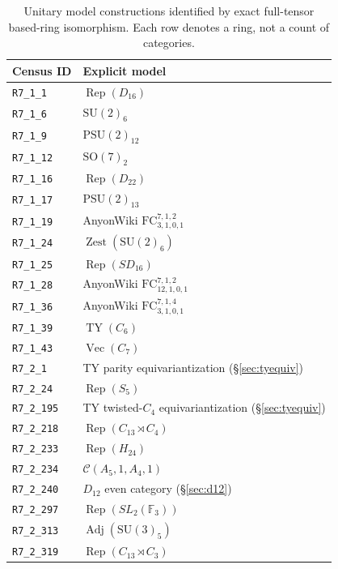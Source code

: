 \begin{table}[H]
\centering
\small
\caption{Unitary model constructions identified by exact full-tensor based-ring isomorphism. Each row denotes a ring, not a count of categories.}\label{tab:models}
\begin{tabular}{@{}l l@{}}
\toprule
Census ID & Explicit model\\
\midrule
\texttt{R7\_1\_1} & $\operatorname{Rep}(D_{16})$\\
\texttt{R7\_1\_6} & $\mathrm{SU}(2)_6$\\
\texttt{R7\_1\_9} & $\mathrm{PSU}(2)_{12}$\\
\texttt{R7\_1\_12} & $\mathrm{SO}(7)_2$\\
\texttt{R7\_1\_16} & $\operatorname{Rep}(D_{22})$\\
\texttt{R7\_1\_17} & $\mathrm{PSU}(2)_{13}$\\
\texttt{R7\_1\_19} & AnyonWiki $\mathrm{FC}^{7,1,2}_{3,1,0,1}$\\
\texttt{R7\_1\_24} & $\operatorname{Zest}(\mathrm{SU}(2)_6)$\\
\texttt{R7\_1\_25} & $\operatorname{Rep}(SD_{16})$\\
\texttt{R7\_1\_28} & AnyonWiki $\mathrm{FC}^{7,1,2}_{12,1,0,1}$\\
\texttt{R7\_1\_36} & AnyonWiki $\mathrm{FC}^{7,1,4}_{3,1,0,1}$\\
\texttt{R7\_1\_39} & $\operatorname{TY}(C_6)$\\
\texttt{R7\_1\_43} & $\operatorname{Vec}(C_7)$\\
\texttt{R7\_2\_1} & TY parity equivariantization (\S\ref{sec:tyequiv})\\
\texttt{R7\_2\_24} & $\operatorname{Rep}(S_5)$\\
\texttt{R7\_2\_195} & TY twisted-$C_4$ equivariantization (\S\ref{sec:tyequiv})\\
\texttt{R7\_2\_218} & $\operatorname{Rep}(C_{13}\rtimes C_4)$\\
\texttt{R7\_2\_233} & $\operatorname{Rep}(H_{24})$\\
\texttt{R7\_2\_234} & $\mathcal C(A_5,1,A_4,1)$\\
\texttt{R7\_2\_240} & $D_{12}$ even category (\S\ref{sec:d12})\\
\texttt{R7\_2\_297} & $\operatorname{Rep}(SL_2(\mathbb F_3))$\\
\texttt{R7\_2\_313} & $\operatorname{Adj}(\mathrm{SU}(3)_5)$\\
\texttt{R7\_2\_319} & $\operatorname{Rep}(C_{13}\rtimes C_3)$\\

\end{tabular}
\end{table}
